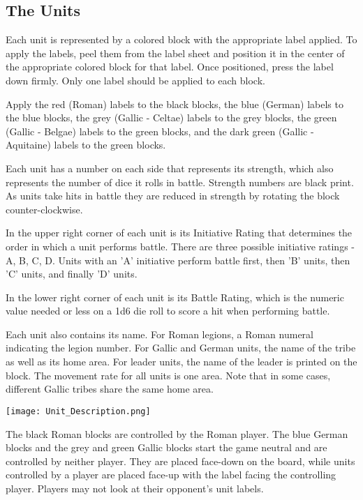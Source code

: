 \par
\subsection{The Units}
Each unit is represented by a colored block with the appropriate label applied. To apply the labels, peel them from the label sheet and position it in the center of the appropriate colored block for that label. Once positioned, press the label down firmly. Only one label should be applied to each block.

Apply the red (Roman) labels to the black blocks, the blue (German) labels to the blue blocks, the grey (Gallic - Celtae) labels to the grey blocks, the green (Gallic - Belgae) labels to the green blocks, and the dark green (Gallic - Aquitaine) labels to the green blocks.

Each unit has a number on each side that represents its strength, which also represents the number of dice it rolls in battle. Strength numbers are black print. As units take hits in battle they are reduced in strength by rotating the block counter-clockwise.

In the upper right corner of each unit is its Initiative Rating that determines the order in which a unit performs battle. There are three possible initiative ratings - A, B, C, D. Units with an 'A' initiative perform battle first, then 'B' units, then 'C' units, and finally 'D' units.

In the lower right corner of each unit is its Battle Rating, which is the numeric value needed or less on a 1d6 die roll to score a hit when performing battle.

Each unit also contains its name. For Roman legions, a Roman numeral indicating the legion number. For Gallic and German units, the name of the tribe as well as its home area. For leader units, the name of the leader is printed on the block. The movement rate for all units is one area. Note that in some cases, different Gallic tribes share the same home area.

\texttt{[image: Unit\_Description.png]}

The black Roman blocks are controlled by the Roman player. The blue German blocks and the grey and green Gallic blocks start the game neutral and are controlled by neither player. They are placed face-down on the board, while units controlled by a player are placed face-up with the label facing the controlling player. Players may not look at their opponent's unit labels.

